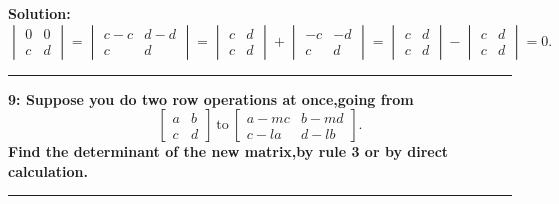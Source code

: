 \documentclass[11pt]{article}
\newcommand\question[2]{\vspace{.25in}\hrule\textbf{#1: #2}\vspace{.5em}\hrule\vspace{.10in}}
\newcommand\solution{\vspace{.10in}\textbf{Solution: }}
\begin{document}
\solution $
\begin{vmatrix}
  0&0\\
  c&d
\end{vmatrix}=
\begin{vmatrix}
  c-c&d-d\\
  c&d
\end{vmatrix}=
\begin{vmatrix}
  c&d\\
  c&d
\end{vmatrix}+
\begin{vmatrix}
  -c&-d\\
  c&d
\end{vmatrix}=
\begin{vmatrix}
  c&d\\
  c&d
\end{vmatrix}-
\begin{vmatrix}
  c&d\\
c&d
\end{vmatrix}=0.
$
\question{9}{Suppose you do two row operations at once,going from 
$$
\begin{bmatrix}
  a&b\\
  c&d
\end{bmatrix}~\mbox{to}~
\begin{bmatrix}
  a-mc&b-md\\
  c-la&d-lb
\end{bmatrix}.
$$
Find the determinant of the new matrix,by rule 3 or by direct calculation.
}
\end{document}
